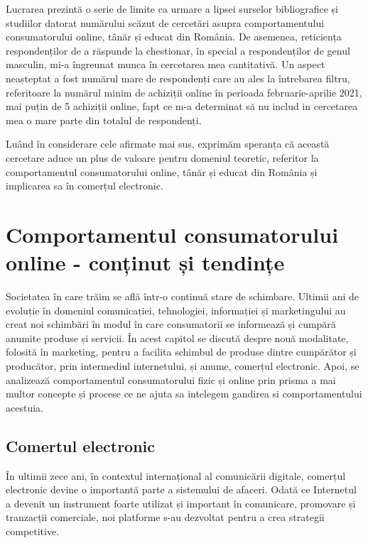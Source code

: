 \documentclass[a4paper, 12pt]{article}
\begin{document}
	\quad Lucrarea prezintă o serie de limite ca urmare a lipsei surselor bibliografice și studiilor datorat numărului scăzut de cercetări asupra comportamentului consumatorului online, tânăr și educat din România. De asemenea, reticiența respondenților de a răspunde la chestionar, în special a respondenților de genul masculin, mi-a îngreunat munca în cercetarea mea cantitativă. Un aspect neașteptat a fost numărul mare de respondenți care au ales la întrebarea filtru, referitoare la numărul minim de achiziții online în perioada februarie-aprilie 2021, mai puțin de 5 achiziții online, fapt ce m-a determinat să nu includ in cercetarea mea o mare parte din totalul de respondenți.
	
	\quad Luând în considerare cele afirmate mai sus, exprimăm speranța că această cercetare aduce un plus de valoare pentru domeniul teoretic, referitor la comportamentul consumatorului online, tânăr și educat din România și implicarea sa în comerțul electronic.
		
	\newpage
	\setcounter{section}{0}
	\section{Comportamentul consumatorului online - conținut și tendințe}
	
	\quad\quad Societatea în care trăim se află într-o continuă stare de schimbare. Ultimii ani de evoluție în domeniul comunicației, tehnologiei, informației și marketingului au creat noi schimbări în modul în care consumatorii se informează și cumpără anumite produse și servicii. În acest capitol se discută despre nouă modalitate, folosită în marketing, pentru a facilita schimbul de produse dintre cumpărător și producător, prin intermediul internetului, și anume, comerțul electronic. Apoi, se analizează comportamentul consumatorului fizic și online prin prisma a mai multor concepte și procese ce ne ajuta sa intelegem gandirea si comportamentului acestuia. 

		\subsection{Comertul electronic}
	\quad \quad\space În ultimii zece ani, în contextul internațional al comunicării digitale, comerțul electronic devine o importantă parte a sistemului de afaceri. Odată ce Internetul a devenit un instrument foarte utilizat și important în comunicare, promovare și tranzacții comerciale, noi platforme s-au dezvoltat pentru a crea strategii competitive.
	
\end{document}
